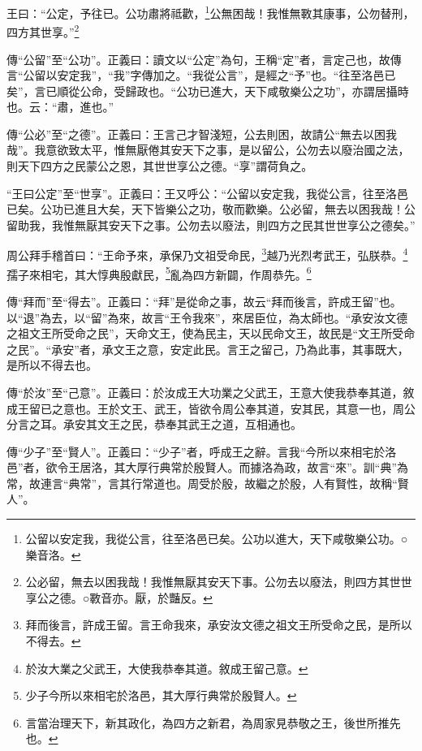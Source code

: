 王曰：“公定，予往已。公功肅將祗歡，\footnote{公留以安定我，我從公言，往至洛邑已矣。公功以進大，天下咸敬樂公功。○樂音洛。}公無困哉！我惟無斁其康事，公勿替刑，四方其世享。”\footnote{公必留，無去以困我哉！我惟無厭其安天下事。公勿去以廢法，則四方其世世享公之德。○斁音亦。厭，於豔反。}


{\noindent\zhuan{}\fzbyks 傳“公留”至“公功”。正義曰：讀文以“公定”為句，王稱“定”者，言定己也，故傳言“公留以安定我”，“我”字傳加之。“我從公言”，是經之“予”也。“往至洛邑已矣”，言已順從公命，受歸政也。“公功已進大，天下咸敬樂公之功”，亦謂居攝時也。云：“肅，進也。” \par}

{\noindent\zhuan{}\fzbyks 傳“公必”至“之德”。正義曰：王言己才智淺短，公去則困，故請公“無去以困我哉”。我意欲致太平，惟無厭倦其安天下之事，是以留公，公勿去以廢治國之法，則天下四方之民蒙公之恩，其世世享公之德。“享”謂荷負之。 \par}

{\noindent\shu{}\fzkt “王曰公定”至“世享”。正義曰：王又呼公：“公留以安定我，我從公言，往至洛邑已矣。公功已進且大矣，天下皆樂公之功，敬而歡樂。公必留，無去以困我哉！公留助我，我惟無厭其安天下之事。公勿去以廢法，則四方之民其世世享公之德矣。” \par}

周公拜手稽首曰：“王命予來，承保乃文祖受命民，\footnote{拜而後言，許成王留。言王命我來，承安汝文德之祖文王所受命之民，是所以不得去。}越乃光烈考武王，弘朕恭。\footnote{於汝大業之父武王，大使我恭奉其道。敘成王留己意。}孺子來相宅，其大惇典殷獻民，\footnote{少子今所以來相宅於洛邑，其大厚行典常於殷賢人。}亂為四方新闢，作周恭先。\footnote{言當治理天下，新其政化，為四方之新君，為周家見恭敬之王，後世所推先也。}


{\noindent\zhuan{}\fzbyks 傳“拜而”至“得去”。正義曰：“拜”是從命之事，故云“拜而後言，許成王留”也。以“退”為去，以“留”為來，故言“王令我來”，來居臣位，為太師也。“承安汝文德之祖文王所受命之民”，天命文王，使為民主，天以民命文王，故民是“文王所受命之民”。“承安”者，承文王之意，安定此民。言王之留己，乃為此事，其事既大，是所以不得去也。 \par}

{\noindent\zhuan{}\fzbyks 傳“於汝”至“己意”。正義曰：於汝成王大功業之父武王，王意大使我恭奉其道，敘成王留已之意也。王於文王、武王，皆欲令周公奉其道，安其民，其意一也，周公分言之耳。承安其文王之民，恭奉其武王之道，互相通也。 \par}

{\noindent\zhuan{}\fzbyks 傳“少子”至“賢人”。正義曰：“少子”者，呼成王之辭。言我“今所以來相宅於洛邑”者，欲令王居洛，其大厚行典常於殷賢人。而據洛為政，故言“來”。訓“典”為常，故連言“典常”，言其行常道也。周受於殷，故繼之於殷，人有賢性，故稱“賢人”。 \par}

